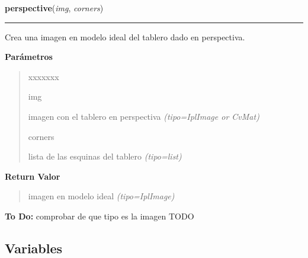 \hspace{.8\funcindent}\begin{boxedminipage}{\funcwidth}

    \raggedright \textbf{perspective}(\textit{img}, \textit{corners})

    \vspace{-1.5ex}

    \rule{\textwidth}{0.5\fboxrule}
\setlength{\parskip}{2ex}
Crea una imagen en modelo ideal del tablero dado en perspectiva.

\setlength{\parskip}{1ex}
      \textbf{Parámetros}
      \vspace{-1ex}

      \begin{quote}
        \begin{Ventry}{xxxxxxx}

          \item[img]


imagen con el tablero en perspectiva
            {\it (tipo=IplImage or CvMat)}

          \item[corners]


lista de las esquinas del tablero
            {\it (tipo=list)}

        \end{Ventry}

      \end{quote}

      \textbf{Return Valor}
    \vspace{-1ex}

      \begin{quote}

imagen en modelo ideal
      {\it (tipo=IplImage)}

      \end{quote}

\textbf{To Do:} 
comprobar de que tipo es la imagen TODO


    \end{boxedminipage}



  \subsection{Variables}

